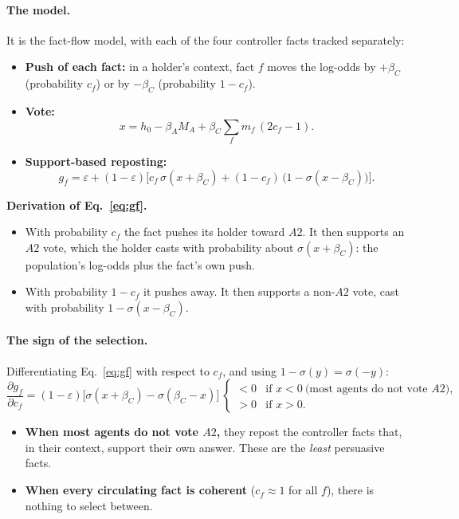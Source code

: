 \documentclass[10pt,a4paper]{article}
\begin{document}
\paragraph{The model.} It is the fact-flow model, with each of the four controller facts tracked separately:
\begin{itemize}
\item \textbf{Push of each fact:} in a holder's context, fact $f$ moves the log-odds by $+\beta_C$ (probability $c_f$)
  or by $-\beta_C$ (probability $1-c_f$).
\item \textbf{Vote:}
  \begin{equation}
  x=h_0-\beta_A M_A+\beta_C\sum_f m_f\,(2c_f-1).
  \end{equation}
\item \textbf{Support-based reposting:}
  \begin{equation}
  g_f=\varepsilon+(1-\varepsilon)\Big[c_f\,\sigma(x+\beta_C)+(1-c_f)\,\big(1-\sigma(x-\beta_C)\big)\Big].\label{eq:gf}
  \end{equation}
\end{itemize}
\textbf{Derivation of Eq.~\eqref{eq:gf}.}
\begin{itemize}
\item With probability $c_f$ the fact pushes its holder toward $A2$. It then supports an $A2$ vote, which the holder
  casts with probability about $\sigma(x+\beta_C)$: the population's log-odds plus the fact's own push.
\item With probability $1-c_f$ it pushes away. It then supports a non-$A2$ vote, cast with probability
  $1-\sigma(x-\beta_C)$.
\end{itemize}

\paragraph{The sign of the selection.} Differentiating Eq.~\eqref{eq:gf} with respect to $c_f$, and using
$1-\sigma(y)=\sigma(-y)$:
\begin{equation}
\frac{\partial g_f}{\partial c_f}=(1-\varepsilon)\big[\sigma(x+\beta_C)-\sigma(\beta_C-x)\big]
\ \begin{cases}<0 & \text{if } x<0\ \text{(most agents do not vote $A2$)},\\ >0 & \text{if } x>0 .\end{cases}
\end{equation}
\begin{itemize}
\item \textbf{When most agents do not vote $A2$,} they repost the controller facts that, in their context, support their
  own answer. These are the \emph{least} persuasive facts.
\item \textbf{When every circulating fact is coherent} ($c_f\approx1$ for all $f$), there is nothing to select between.
\end{itemize}
\end{document}
